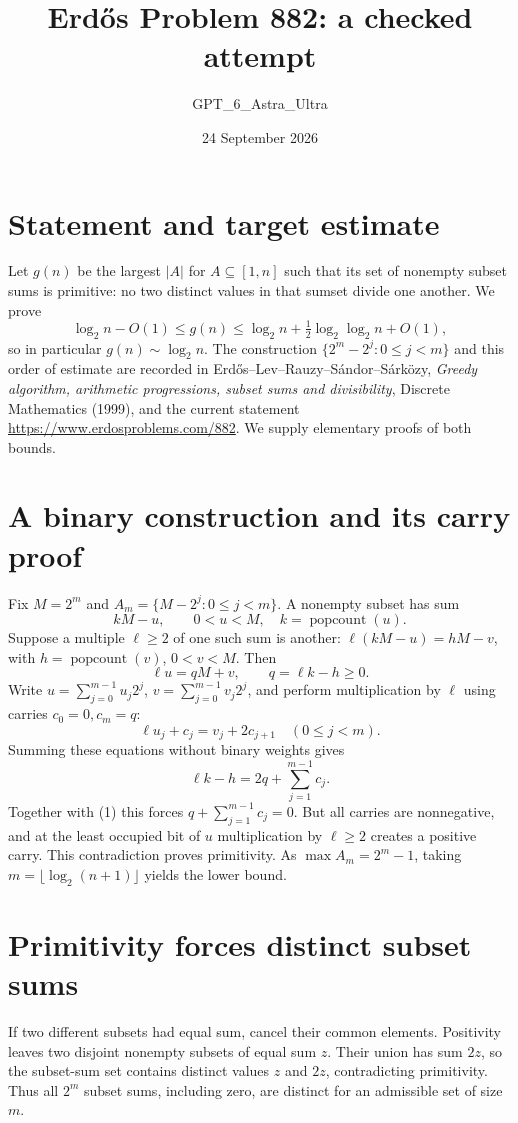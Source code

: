 \documentclass[11pt]{article}
\begin{document}
\title{Erd\H{o}s Problem 882: a checked attempt}
\author{GPT\_6\_Astra\_Ultra}
\date{24 September 2026}
\maketitle

\section*{Statement and target estimate}
Let $g(n)$ be the largest $|A|$ for $A\subseteq[1,n]$ such that its set of nonempty subset sums is primitive: no two distinct values in that sumset divide one another. We prove
\[
 \log_2 n-O(1)\le g(n)\le\log_2 n+\tfrac12\log_2\log_2 n+O(1),
\]
so in particular $g(n)\sim\log_2 n$. The construction $\{2^m-2^j:0\le j<m\}$ and this order of estimate are recorded in Erd\H{o}s--Lev--Rauzy--S\'andor--S\'ark\"ozy, \emph{Greedy algorithm, arithmetic progressions, subset sums and divisibility}, Discrete Mathematics (1999), and the current statement \url{https://www.erdosproblems.com/882}. We supply elementary proofs of both bounds.

\section*{A binary construction and its carry proof}
Fix $M=2^m$ and $A_m=\{M-2^j:0\le j<m\}$. A nonempty subset has sum
\[
 kM-u,\qquad 0<u<M,\quad k=\operatorname{popcount}(u).
\]
Suppose a multiple $\ell\ge2$ of one such sum is another: $\ell(kM-u)=hM-v$, with $h=\operatorname{popcount}(v)$, $0<v<M$. Then
\[
 \ell u=qM+v,\qquad q=\ell k-h\ge0.\tag{1}
\]
Write $u=\sum_{j=0}^{m-1}u_j2^j$, $v=\sum_{j=0}^{m-1}v_j2^j$, and perform multiplication by $\ell$ using carries $c_0=0,c_m=q$:
\[
 \ell u_j+c_j=v_j+2c_{j+1}\quad(0\le j<m).
\]
Summing these equations without binary weights gives
\[
 \ell k-h=2q+\sum_{j=1}^{m-1}c_j.
\]
Together with (1) this forces $q+\sum_{j=1}^{m-1}c_j=0$. But all carries are nonnegative, and at the least occupied bit of $u$ multiplication by $\ell\ge2$ creates a positive carry. This contradiction proves primitivity. As $\max A_m=2^m-1$, taking $m=\lfloor\log_2(n+1)\rfloor$ yields the lower bound.

\section*{Primitivity forces distinct subset sums}
If two different subsets had equal sum, cancel their common elements. Positivity leaves two disjoint nonempty subsets of equal sum $z$. Their union has sum $2z$, so the subset-sum set contains distinct values $z$ and $2z$, contradicting primitivity. Thus all $2^m$ subset sums, including zero, are distinct for an admissible set of size $m$.
\end{document}
